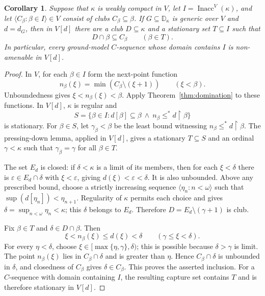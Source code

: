 \documentclass[10pt,a4paper]{amsart}
\newtheorem{corollary}[theorem]{Corollary}
\theoremstyle{definition}
\theoremstyle{remark}
\newcommand{\D}{\mathbb D}
\DeclareMathOperator{\Inacc}{Inacc}
\begin{document}
\begin{corollary}\label{cor:capture}
Suppose that \(\kappa\) is weakly compact in \(V\), let
\(I=\Inacc^V(\kappa)\), and let
\(\langle C_\beta:\beta\in I\rangle\in V\) consist of clubs
\(C_\beta\subseteq\beta\). If \(G\subseteq\D_\kappa\) is
generic over \(V\) and \(d=d_G\), then in \(V[d]\) there are
a club \(D\subseteq\kappa\) and a stationary set
\(T\subseteq I\) such that
\[
 D\cap\beta\subseteq C_\beta\qquad(\beta\in T).
\]
In particular, every ground-model \(C\)-sequence whose domain
contains \(I\) is non-amenable in \(V[d]\).
\end{corollary}
\begin{proof}
In \(V\), for each \(\beta\in I\) form the next-point function
\[
 n_\beta(\xi)=\min(C_\beta\setminus(\xi+1))
                              \qquad(\xi<\beta).
\]
Unboundedness gives \(\xi<n_\beta(\xi)<\beta\). Apply
Theorem~\ref{thm:domination} to these functions. In \(V[d]\),
\(\kappa\) is regular and
\[
 S=\{\beta\in I:d[\beta]\subseteq\beta
                  \ \land\ n_\beta\leq^*d\restriction\beta\}
\]
is stationary. For \(\beta\in S\), let
\(\gamma_\beta<\beta\) be the least bound witnessing
\(n_\beta\leq^*d\restriction\beta\). The pressing-down lemma, applied
in \(V[d]\), gives a stationary \(T\subseteq S\) and an
ordinal \(\gamma<\kappa\) such that
\(\gamma_\beta=\gamma\) for all \(\beta\in T\).

The set \(E_d\) is closed: if \(\delta<\kappa\) is a limit
of its members, then for each \(\xi<\delta\) there is
\(\varepsilon\in E_d\cap\delta\) with \(\xi<\varepsilon\),
giving \(d(\xi)<\varepsilon<\delta\). It is also unbounded.
Above any prescribed bound, choose a strictly increasing sequence
\(\langle\eta_n:n<\omega\rangle\) such that
\(\sup(d[\eta_n])<\eta_{n+1}\). Regularity of \(\kappa\)
permits each choice and gives
\(\delta=\sup_{n<\omega}\eta_n<\kappa\); this \(\delta\)
belongs to \(E_d\). Therefore
\(D=E_d\setminus(\gamma+1)\) is club.

Fix \(\beta\in T\) and \(\delta\in D\cap\beta\). Then
\[
 \xi<n_\beta(\xi)\leq d(\xi)<\delta
                     \qquad(\gamma\leq\xi<\delta).
\]
For every \(\eta<\delta\), choose
\(\xi\in[\max\{\eta,\gamma\},\delta)\); this is possible
because \(\delta>\gamma\) is limit. The point
\(n_\beta(\xi)\) lies in \(C_\beta\cap\delta\) and is
greater than \(\eta\). Hence \(C_\beta\cap\delta\) is
unbounded in \(\delta\), and closedness of \(C_\beta\) gives
\(\delta\in C_\beta\). This proves the asserted inclusion.
For a \(C\)-sequence with domain containing \(I\), the resulting
capture set contains \(T\) and is therefore stationary in
\(V[d]\).
\end{proof}
\end{document}
